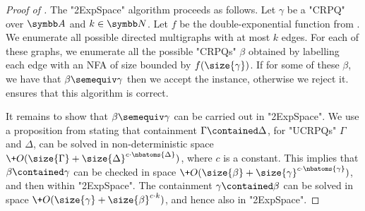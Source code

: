 \begin{proof}[Proof of ]
	The "2ExpSpace" algorithm proceeds as follows. Let $\gamma$ be a "CRPQ"  over $\A$ and $k\in\N$. Let $f$ be the double-exponential function from . We enumerate all possible directed multigraphs with at most $k$ edges. For each of these graphs, we enumerate all the possible "CRPQs" $\beta$ obtained by labelling each edge with an NFA of size bounded by $f(\size{\gamma})$. If for some of these $\beta$, we have that $\beta\semequiv \gamma$ then we accept the instance, otherwise we reject it.  ensures that this algorithm is correct.

	It remains to show that  $\beta\semequiv \gamma$ can be carried out in "2ExpSpace". We use a proposition from \cite[Proposition 3.11, p. 17]{FigueiraMorvan2025SemanticTreeWidthLMCS} stating that containment $\Gamma\contained \Delta$, for "UCRPQs" $\Gamma$ and  $\Delta$, can be solved in non-deterministic space $\+O(\size{\Gamma} + \size{\Delta}^{c\cdot \nbatoms{\Delta}})$, where $c$ is a constant. This implies that $\beta\contained \gamma$ can be checked in space $\+O(\size{\beta} + \size{\gamma}^{c\cdot \nbatoms{\gamma}})$, and then within "2ExpSpace". The containment $\gamma\contained \beta$ can be solved in space $\+O(\size{\gamma} + \size{\beta}^{c\cdot k})$, and hence also in "2ExpSpace".
\end{proof}


